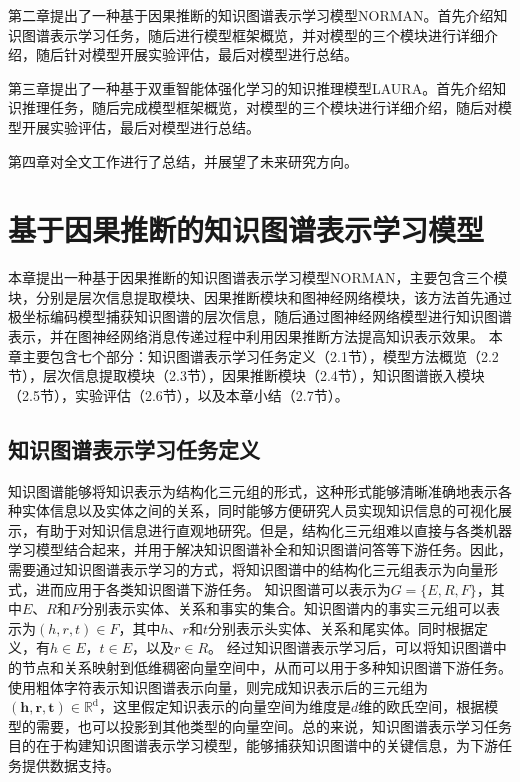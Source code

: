 \documentclass[algorithmlist, AutoFakeBold, AutoFakeSlant, figurelist, tablelist, nomlist, engineering]{seuthesix}
\begin{document}
第二章提出了一种基于因果推断的知识图谱表示学习模型NORMAN。首先介绍知识图谱表示学习任务，随后进行模型框架概览，并对模型的三个模块进行详细介绍，随后针对模型开展实验评估，最后对模型进行总结。

第三章提出了一种基于双重智能体强化学习的知识推理模型LAURA。首先介绍知识推理任务，随后完成模型框架概览，对模型的三个模块进行详细介绍，随后对模型开展实验评估，最后对模型进行总结。

第四章对全文工作进行了总结，并展望了未来研究方向。


\chapter{基于因果推断的知识图谱表示学习模型}
本章提出一种基于因果推断的知识图谱表示学习模型NORMAN，主要包含三个模块，分别是层次信息提取模块、因果推断模块和图神经网络模块，该方法首先通过极坐标编码模型捕获知识图谱的层次信息，随后通过图神经网络模型进行知识图谱表示，并在图神经网络消息传递过程中利用因果推断方法提高知识表示效果。
本章主要包含七个部分：知识图谱表示学习任务定义（2.1节），模型方法概览（2.2节），层次信息提取模块（2.3节），因果推断模块（2.4节），知识图谱嵌入模块（2.5节），实验评估（2.6节），以及本章小结（2.7节）。

\section{知识图谱表示学习任务定义}
知识图谱能够将知识表示为结构化三元组的形式，这种形式能够清晰准确地表示各种实体信息以及实体之间的关系，同时能够方便研究人员实现知识信息的可视化展示，有助于对知识信息进行直观地研究。但是，结构化三元组难以直接与各类机器学习模型结合起来，并用于解决知识图谱补全和知识图谱问答等下游任务。因此，需要通过知识图谱表示学习的方式，将知识图谱中的结构化三元组表示为向量形式，进而应用于各类知识图谱下游任务。
知识图谱可以表示为$G=\{E, R, F\}$，其中$E$、$R$和$F$分别表示实体、关系和事实的集合。知识图谱内的事实三元组可以表示为$(h, r, t) \in F$，其中$h$、$r$和$t$分别表示头实体、关系和尾实体。同时根据定义，有$h \in E$，$t \in E$，以及$r \in R$。
经过知识图谱表示学习后，可以将知识图谱中的节点和关系映射到低维稠密向量空间中，从而可以用于多种知识图谱下游任务。使用粗体字符表示知识图谱表示向量，则完成知识表示后的三元组为$\left(\bm{h}, \bm{r}, \bm{t}\right) \in \mathbb{R}^{\mathrm{d}}$，这里假定知识表示的向量空间为维度是$d$维的欧氏空间，根据模型的需要，也可以投影到其他类型的向量空间。总的来说，知识图谱表示学习任务目的在于构建知识图谱表示学习模型，能够捕获知识图谱中的关键信息，为下游任务提供数据支持。
\end{document}
